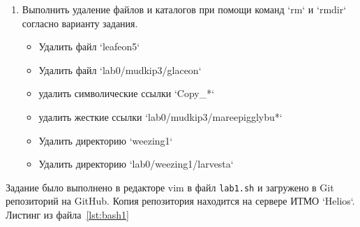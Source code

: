 \begin{enumerate}
        \item Выполнить удаление файлов и каталогов при помощи команд `rm` и `rmdir` согласно варианту задания.
        \begin{itemize}
            \item Удалить файл `leafeon5`
            \item Удалить файл `lab0/mudkip3/glaceon`
            \item удалить символические ссылки `Copy\_*`
            \item удалить жесткие ссылки `lab0/mudkip3/mareepigglybu*`
            \item Удалить директорию `weezing1`
            \item Удалить директорию `lab0/weezing1/larvesta`
        \end{itemize}
    \end{enumerate}



    \newpage
    Задание было выполнено в редакторе vim в файл \verb|lab1.sh| и загружено в Git репозиторий на GitHub. Копия репозитория находится на сервере ИТМО `Helios`.
    Листинг из файла~\ref{lst:bash1}
    


